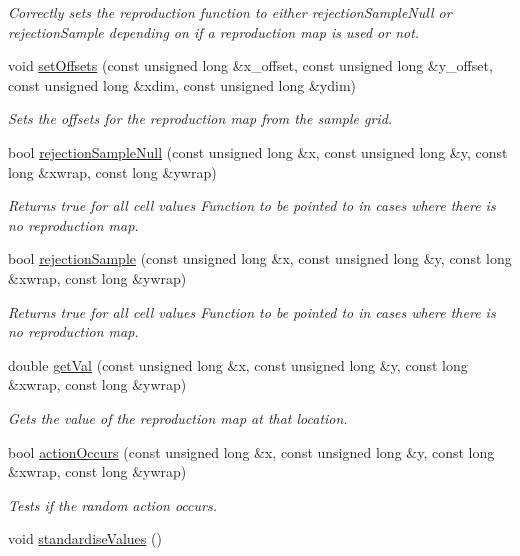 \begin{DoxyCompactItemize}
\begin{DoxyCompactList}\small\item\em Correctly sets the reproduction function to either rejection\+Sample\+Null or rejection\+Sample depending on if a reproduction map is used or not. \end{DoxyCompactList}\item 
void \hyperlink{class_activity_map_acf8157c6154cc369a9087809c9ed041c}{set\+Offsets} (const unsigned long \&x\+\_\+offset, const unsigned long \&y\+\_\+offset, const unsigned long \&xdim, const unsigned long \&ydim)
\begin{DoxyCompactList}\small\item\em Sets the offsets for the reproduction map from the sample grid. \end{DoxyCompactList}\item 
bool \hyperlink{class_activity_map_aa6a93241569a51d46eee123ef386de32}{rejection\+Sample\+Null} (const unsigned long \&x, const unsigned long \&y, const long \&xwrap, const long \&ywrap)
\begin{DoxyCompactList}\small\item\em Returns true for all cell values Function to be pointed to in cases where there is no reproduction map. \end{DoxyCompactList}\item 
bool \hyperlink{class_activity_map_a19890a93eccac57093fc381dac776bb3}{rejection\+Sample} (const unsigned long \&x, const unsigned long \&y, const long \&xwrap, const long \&ywrap)
\begin{DoxyCompactList}\small\item\em Returns true for all cell values Function to be pointed to in cases where there is no reproduction map. \end{DoxyCompactList}\item 
double \hyperlink{class_activity_map_a828dd0f21660f8a0a0465f69320b2ba0}{get\+Val} (const unsigned long \&x, const unsigned long \&y, const long \&xwrap, const long \&ywrap)
\begin{DoxyCompactList}\small\item\em Gets the value of the reproduction map at that location. \end{DoxyCompactList}\item 
bool \hyperlink{class_activity_map_a4935b5ab3b72bd90903e3e9ce7f66c99}{action\+Occurs} (const unsigned long \&x, const unsigned long \&y, const long \&xwrap, const long \&ywrap)
\begin{DoxyCompactList}\small\item\em Tests if the random action occurs. \end{DoxyCompactList}\item 
void \hyperlink{class_activity_map_a444476b8818b0f3ad5e08e4d690d9b49}{standardise\+Values} ()\hypertarget{class_activity_map_a444476b8818b0f3ad5e08e4d690d9b49}{}\label{class_activity_map_a444476b8818b0f3ad5e08e4d690d9b49}


\end{DoxyCompactItemize}
